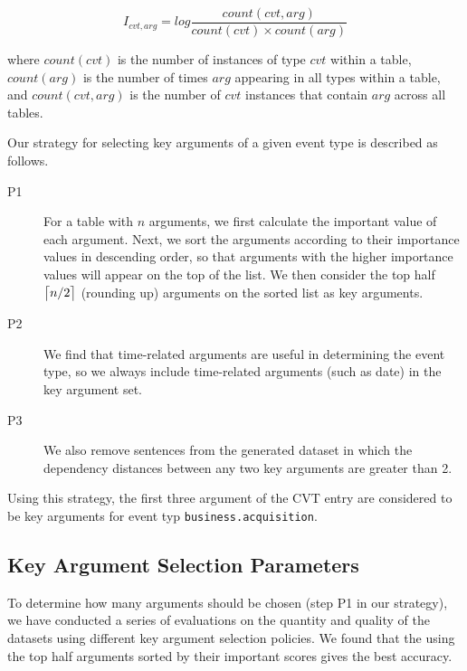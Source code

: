 \begin{equation}
	I_{cvt, arg} = log \frac{count(cvt, arg)}{count(cvt) \times count(arg)}
\end{equation}


where $count(cvt)$ is the number of instances of type $cvt$ within a \CVT table, $count(arg)$ is the number of times $arg$ appearing in all
\CVT types within a \CVT table, and $count(cvt, arg)$ is the number of $cvt$ instances that contain $arg$ across all \CVT tables.


Our strategy for selecting key arguments of a given event type is described as follows.

\begin{description}

\item [P1] For a \CVT table with $n$ arguments, we first calculate the important value of each argument. Next, we sort the arguments
    according to their importance values in descending order, so that arguments with the higher importance values will appear on the top
    of the list. We then consider the top half $\ceil[\big]{n/2}$ (rounding up) arguments on the sorted list as key arguments.

\item [P2] We find that time-related arguments are useful in determining the event type, so we always include time-related arguments
    (such as date) in the key argument set.

\item [P3] We also remove sentences from the generated dataset in which the dependency distances between any two key arguments are
    greater than 2.

\end{description}

Using this strategy, the first three argument of the CVT entry are considered to be key arguments for event typ
\texttt{business.acquisition}.


\subsection{Key Argument Selection Parameters}
To determine how many arguments should be chosen (step P1 in our strategy), we have conducted a series of evaluations on the quantity and
quality of the datasets using different key argument selection policies. We found that the using the top half arguments sorted by their
important scores gives the best accuracy.


